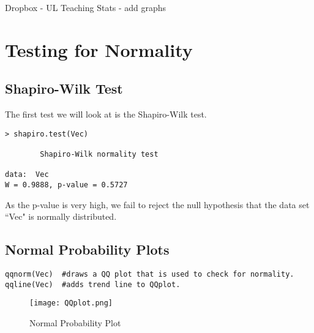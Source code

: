 Dropbox - UL Teaching Stats -  add graphs

\chapter{Testing for Normality}
\section{Shapiro-Wilk Test}
The first test we will look at is the Shapiro-Wilk test.
\begin{verbatim}
> shapiro.test(Vec)

        Shapiro-Wilk normality test

data:  Vec
W = 0.9888, p-value = 0.5727
\end{verbatim}
As the p-value is very high, we fail to reject the null hypothesis that the data set ``Vec" is normally distributed.

\section{Normal Probability Plots}

\begin{verbatim}
qqnorm(Vec)  #draws a QQ plot that is used to check for normality.
qqline(Vec)  #adds trend line to QQplot.
\end{verbatim}

\begin{figure}
  \texttt{[image: QQplot.png]}\\
  \caption{Normal Probability Plot}\label{QQplot}
\end{figure}




